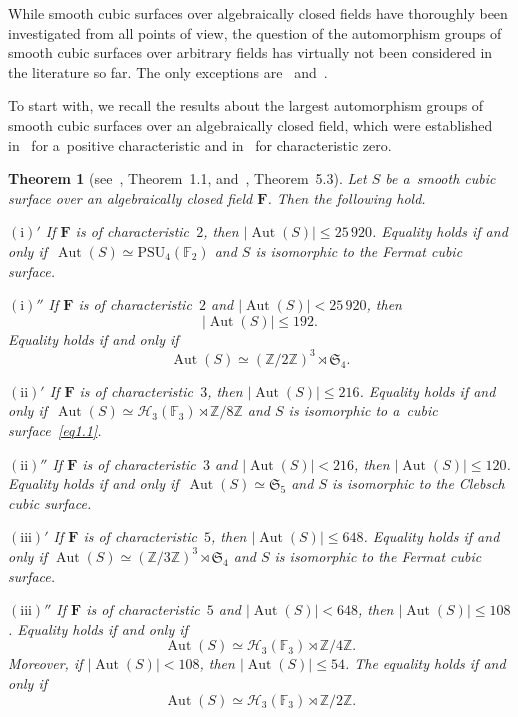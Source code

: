 \documentclass{amsart}
\numberwithin{equation}{section}
\theoremstyle{plain}
\newtheorem{theorem}{Theorem}
\theoremstyle{definition}
\theoremstyle{remark}
\begin{document}
\goodbreak


While smooth cubic surfaces over algebraically closed fields have thoroughly been investigated from all points of view, the question of the automorphism groups of smooth cubic surfaces over arbitrary fields has virtually not been considered in the literature so far. The only exceptions are~\cite{16} and~\cite{18}.


To start with, we recall the results about the largest automorphism groups of smooth cubic surfaces over an algebraically closed field, which were established in~\cite{8} for a~positive characteristic and in~\cite{11} for characteristic zero.

\begin{theorem}[{see~\cite{8}, Theorem~1.1, and~\cite{11}, Theorem~5.3}]
\label{t1}
Let $S$ be a~smooth cubic surface over an algebraically closed field $\mathbf{F}$. Then the following hold.

$(\mathrm{i})'$ If\/ $\mathbf{F}$ is of characteristic~$2$, then $|{\operatorname{Aut}(S)}| \leqslant 25\, 920$. Equality holds if and only if~$\operatorname{Aut}(S)\simeq \mathrm{PSU}_4(\mathbb{F}_2)$ and $S$ is isomorphic to the Fermat cubic surface.

$(\mathrm{i})''$ If\/ $\mathbf{F}$ is of characteristic~$2$ and $|{\operatorname{Aut}(S)}| < 25\, 920$, then
$$
|{\operatorname{Aut}(S)}| \leqslant 192.
$$
Equality holds if and only if
$$
\operatorname{Aut}(S)\simeq (\mathbb{Z}/2\mathbb{Z})^3 \rtimes \mathfrak{S}_4.
$$

$(\mathrm{ii})'$ If\/ $\mathbf{F}$ is of characteristic~$3$, then $|{\operatorname{Aut}(S)}| \leqslant 216$. Equality holds if and only if~$\operatorname{Aut}(S) \simeq \mathcal{H}_3(\mathbb{F}_3) \rtimes \mathbb{Z}/8\mathbb{Z}$ and $S$ is isomorphic to a~cubic surface~\eqref{eq1.1}.

$(\mathrm{ii})''$ If\/ $\mathbf{F}$ is of characteristic~$3$ and $|{\operatorname{Aut}(S)}| < 216$, then $|{\operatorname{Aut}(S)}| \leqslant 120$. Equality holds if and only if~$\operatorname{Aut}(S) \simeq \mathfrak{S}_5$ and $S$ is isomorphic to the Clebsch cubic surface.

$(\mathrm{iii})'$ If\/ $\mathbf{F}$ is of characteristic~$5$, then $|{\operatorname{Aut}(S)}| \leqslant 648$. Equality holds if and only if $\operatorname{Aut}(S) \simeq (\mathbb{Z}/3\mathbb{Z})^3 \rtimes \mathfrak{S}_4$ and $S$ is isomorphic to the Fermat cubic surface.

$(\mathrm{iii})''$ If\/ $\mathbf{F}$ is of characteristic~$5$ and $|{\operatorname{Aut}(S)}| < 648$, then $|{\operatorname{Aut}(S)}| \leqslant 108$. Equality holds if and only if
$$
\operatorname{Aut}(S) \simeq \mathcal{H}_3(\mathbb{F}_3) \rtimes \mathbb{Z}/4\mathbb{Z}.
$$
Moreover, if $|{\operatorname{Aut}(S)}| < 108$, then $|{\operatorname{Aut}(S)}| \leqslant 54$. The equality holds if and only if
$$
\operatorname{Aut}(S) \simeq \mathcal{H}_3(\mathbb{F}_3) \rtimes \mathbb{Z}/2\mathbb{Z}.
$$


\end{theorem}
\end{document}
